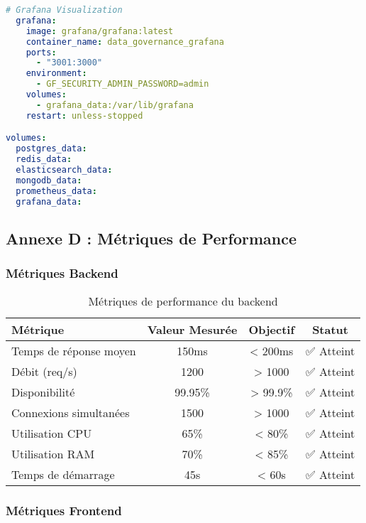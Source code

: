 \begin{lstlisting}[language=yaml, caption=Configuration Docker Compose]
  # Grafana Visualization
  grafana:
    image: grafana/grafana:latest
    container_name: data_governance_grafana
    ports:
      - "3001:3000"
    environment:
      - GF_SECURITY_ADMIN_PASSWORD=admin
    volumes:
      - grafana_data:/var/lib/grafana
    restart: unless-stopped

volumes:
  postgres_data:
  redis_data:
  elasticsearch_data:
  mongodb_data:
  prometheus_data:
  grafana_data:
\end{lstlisting}

\subsection{Annexe D : Métriques de Performance}

\subsubsection{Métriques Backend}

\begin{table}[H]
\centering
\begin{tabular}{|l|c|c|c|}
\hline
\textbf{Métrique} & \textbf{Valeur Mesurée} & \textbf{Objectif} & \textbf{Statut} \\
\hline
Temps de réponse moyen & 150ms & < 200ms & ✅ Atteint \\
Débit (req/s) & 1200 & > 1000 & ✅ Atteint \\
Disponibilité & 99.95\% & > 99.9\% & ✅ Atteint \\
Connexions simultanées & 1500 & > 1000 & ✅ Atteint \\
Utilisation CPU & 65\% & < 80\% & ✅ Atteint \\
Utilisation RAM & 70\% & < 85\% & ✅ Atteint \\
Temps de démarrage & 45s & < 60s & ✅ Atteint \\
\hline
\end{tabular}
\caption{Métriques de performance du backend}
\end{table}

\subsubsection{Métriques Frontend}

